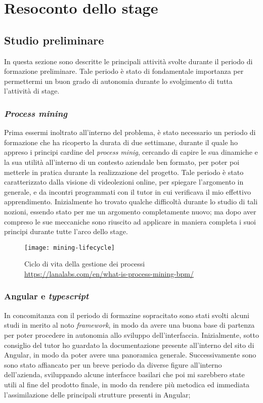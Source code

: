 
\chapter{Resoconto dello stage}
\label{cap:descrizione-stage}



\section{Studio preliminare}
In questa sezione sono descritte le principali attività svolte durante il periodo di formazione preliminare. Tale periodo è stato di fondamentale importanza per permettermi un buon grado di autonomia durante lo svolgimento di tutta l'attività di stage.
\subsection{\textit{Process mining}}
Prima essermi inoltrato all'interno del problema, è stato necessario un periodo di formazione che ha ricoperto la durata di due settimane, durante il quale ho appreso i principi cardine del \textit{process minig}, cercando di capire le sua dinamiche e la sua utilità all'interno di un contesto aziendale ben formato, per poter poi metterle in pratica durante la realizzazione del progetto. Tale periodo è stato caratterizzato dalla visione di videolezioni online, per spiegare l'argomento in generale, e da incontri programmati con il tutor in cui verificava il mio effettivo apprendimento. Inizialmente ho trovato qualche difficoltà durante lo studio di tali nozioni, essendo stato per me un argomento completamente nuovo; ma dopo aver compreso le sue meccaniche sono riuscito ad applicare in maniera completa i suoi principi durante tutte l'arco dello stage.
\begin{figure}[!h] 
	\centering 
	\texttt{[image: mining-lifecycle]} 
	\caption{Ciclo di vita della gestione dei processi \url{https://lanalabs.com/en/what-is-process-mining-bpm/}}
\end{figure}

\subsection{Angular e \textit{typescript}}
In concomitanza con il periodo di formazine sopracitato sono stati svolti alcuni studi in merito al noto \textit{framework}, in modo da avere una buona base di partenza per poter procedere in autonomia allo sviluppo dell'interfaccia. Inizialmente, sotto consiglio del tutor ho guardato la documentazione presente all'interno del sito di Angular, in modo da poter avere una panoramica generale. Successivamente sono sono stato affiancato per un breve periodo da diverse figure all'interno dell'azienda, sviluppando alcune interfacce basilari che poi mi sarebbero state utili al fine del prodotto finale, in modo da rendere più metodica ed immediata l'assimilazione delle principali strutture presenti in Angular;
\newpage
